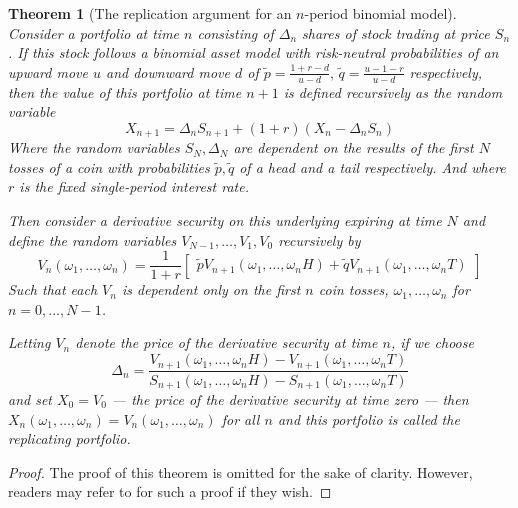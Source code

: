 \documentclass[]{article}
\theoremstyle{remark}
\theoremstyle{plain}
\newtheorem*{theorem}{Theorem}
\begin{document}
\begin{theorem}[The replication argument for an $n$-period binomial model]
	Consider a portfolio at time $n$ consisting of $\Delta _n$ shares of stock trading at price $S_n$. If this stock follows a binomial asset model with risk-neutral probabilities of an upward move $u$ and downward move $d$ of $\tilde{p} = \frac{1+r-d}{u-d}, \, \tilde{q} = \frac{u-1-r}{u-d}$ respectively, then the value of this portfolio at time $n+1$ is defined recursively as the random variable
	\begin{equation}
		X_{n+1} = \Delta_{n}S_{n+1}+(1+r)(X_{n}-\Delta_{n}S_{n})
	\end{equation}
	Where the random variables $S_{N},\Delta_{N}$ are dependent on the results of the first $N$ tosses of a coin with probabilities $\tilde{p},\tilde{q}$ of a head and a tail respectively. And where $r$ is the fixed single-period interest rate.
	
	\medskip
	
	\noindent Then consider a derivative security on this underlying expiring at time $N$ and define the random variables $V_{N-1},\ldots,V_1,V_0$ recursively by
	\begin{equation}
		V_{n}(\omega_{1},\ldots,\omega_{n}) = \frac{1}{1+r}\begin{bmatrix} \tilde{p}V_{n+1}(\omega_{1},\ldots,\omega_{n}H) + \tilde{q}V_{n+1}(\omega_{1},\ldots,\omega_{n}T)\end{bmatrix}
	\end{equation}
	Such that each $V_n$ is dependent only on the first $n$ coin tosses, $\omega_1, \ldots, \omega_n$ for $n = 0, \ldots, N-1$.
	
	\medskip
	
	\noindent Letting $V_n$ denote the price of the derivative security at time $n$, if we choose
	\begin{equation}
		\Delta_{n} = \displaystyle \frac{V_{n+1}(\omega_{1},\ldots,\omega_{n}H) - V_{n+1}(\omega_{1},\ldots,\omega_{n}T)}{S_{n+1}(\omega_{1},\ldots,\omega_{n}H) - S_{n+1} (\omega_{1},\ldots,\omega_{n}T)}
	\end{equation}
	and set $X_0 = V_0$ --- the price of the derivative security at time zero --- then $X_n (\omega_1,\ldots,\omega_n) = V_n (\omega_1,\ldots,\omega_n)$ for all $n$ and this portfolio is called the replicating portfolio.
\end{theorem}

\begin{proof}
	\renewcommand{\qedsymbol}{}
	The proof of this theorem is omitted for the sake of clarity. However, readers may refer to \cite[p.~13]{SHREVE_2004} for such a proof if they wish.
\end{proof}
\end{document}
